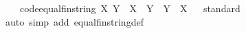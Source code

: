 \begin{isabellebody}
\ \ \ {\isacharbrackleft}code{\isacharbrackright}{\isacharcolon}{\isachardoublequoteopen}equal{\isacharunderscore}fin{\isacharunderscore}string\ X\ Y\ {\isacharequal}\ {\isacharparenleft}X\ {\isasymle}\ Y\ {\isasymand}\ Y\ {\isasymle}\ X{\isacharparenright}{\isachardoublequoteclose}\isanewline
{}\isamarkupfalse%
\isanewline
%
\isadelimproof
\ \ %
\endisadelimproof
%
\isatagproof
{}\isamarkupfalse%
{\isacharparenleft}standard{\isacharparenright}\isanewline
\ \ \isamarkupfalse%
{\isacharparenleft}auto\ simp\ add{\isacharcolon}\ equal{\isacharunderscore}fin{\isacharunderscore}string{\isacharunderscore}def{\isacharparenright}%
\endisatagproof
{\isafoldproof}%
%
\isadelimproof
\isanewline
%
\endisadelimproof
{}\isamarkupfalse%
\isanewline
%
\isadelimtheory
%
\endisadelimtheory
%
\isatagtheory
{}\isamarkupfalse%
%
\endisatagtheory
{\isafoldtheory}%
%
\isadelimtheory
%
\endisadelimtheory
%
\end{isabellebody}%
\endinput
